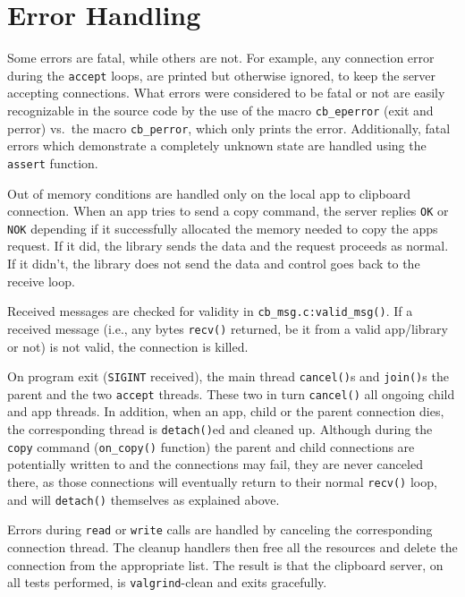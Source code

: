 \documentclass[a4paper, titlepage, english]{article}
\begin{document}
\section{Error Handling}
\par
Some errors are fatal, while others are not. For example, any connection error during the \texttt{accept} loops, are printed but otherwise ignored, to keep the server accepting connections. What errors were considered to be fatal or not are easily recognizable in the source code by the use of the macro \texttt{cb\_eperror} (exit and perror) vs.\ the macro \texttt{cb\_perror}, which only prints the error. Additionally, fatal errors which demonstrate a completely unknown state are handled using the \texttt{assert} function.
\par
Out of memory conditions are handled only on the local app to clipboard connection. When an app tries to send a copy command, the server replies \texttt{OK} or \texttt{NOK} depending if it successfully allocated the memory needed to copy the apps request. If it did, the library sends the data and the request proceeds as normal. If it didn't, the library does not send the data and control goes back to the receive loop.
\par
Received messages are checked for validity in \texttt{cb\_msg.c:valid\_msg()}. If a received message (i.e., any bytes \texttt{recv()} returned, be it from a valid app/library or not) is not valid, the connection is killed.
\par
On program exit (\texttt{SIGINT} received), the main thread \texttt{cancel()}s and \texttt{join()}s the parent and the two \texttt{accept} threads. These two in turn \texttt{cancel()} all ongoing child and app threads. In addition, when an app, child or the parent connection dies, the corresponding thread is \texttt{detach()}ed and cleaned up. Although during the \texttt{copy} command (\texttt{on\_copy()} function) the parent and child connections are potentially written to and the connections may fail, they are never canceled there, as those connections will eventually return to their normal \texttt{recv()} loop, and will \texttt{detach()} themselves as explained above.
\par
Errors during \texttt{read} or \texttt{write} calls are handled by canceling the corresponding connection thread. The cleanup handlers then free all the resources and delete the connection from the appropriate list. The result is that the clipboard server, on all tests performed, is \texttt{valgrind}-clean and exits gracefully.



\end{document}
